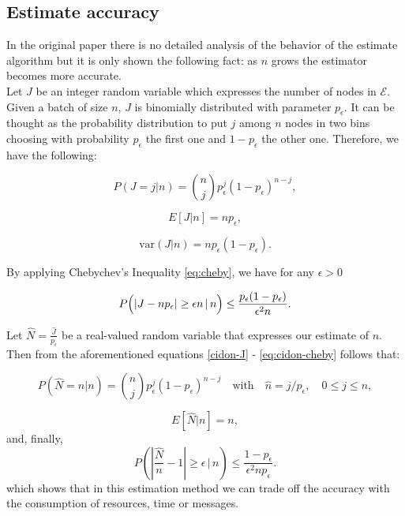 \documentclass[12pt,a4paper]{report}
\newcommand{\pc}{p_{\epsilon}}
\begin{document}
\subsection{Estimate accuracy}
\label{cidon-estimate-accuracy}

In the original paper \cite{cidon} there is no detailed analysis of the behavior of the estimate algorithm but it is only shown the following fact: as $n$ grows the estimator becomes more accurate.\\
    
Let $J$ be an integer random variable which expresses the number of nodes in $\mathcal{E}$. Given a batch of size $n$, $J$ is binomially distributed with parameter $\pc$. It can be thought as the probability distribution to put $j$ among  $n$ nodes in two bins choosing with probability $\pc$ the first one and $1-\pc$ the other one.  Therefore, we have the following:

\begin{equation}
	P(J=j|n)={n \choose j}\pc^{j}(1-\pc)^{n-j},
           \label{cidon-J}
\end{equation}

\begin{equation}
E[J|n]=n\pc ,
\label{cidon-e-estimate}
\end{equation}

\begin{equation}
\textrm{var}(J|n)=n\pc(1-\pc).
\end{equation}


By applying Chebychev's Inequality \eqref{eq:cheby},  we have for any $\epsilon>0$
 
 \begin{equation}
P\Bigl( \left| J-n\pc\right| \geq \epsilon n \,|\, n \Bigr) \leq \frac{\pc(1-\pc)}{\epsilon^{2}n}.
\label{eq:cidon-cheby}
 \end{equation}
 
 Let $\hat{N}={\displaystyle \frac{\hat{J}}{\pc}}$ be a real-valued random variable that expresses our estimate of $n$. Then from the aforementioned equations \eqref{cidon-J} - \eqref{eq:cidon-cheby} follows that:

\begin{equation}
P\left(\hat{N}=n|n\right)={n \choose j}\pc^{j}(1-\pc)^{n-j} \quad \textrm{with} \quad \hat{n}=j/\pc, \quad 0\leq j\leq n,
\end{equation}

\begin{equation}
E[\hat{N}|n]=n,
\end{equation}
and, finally,
 \begin{equation}
P\left( \left| \frac{\hat{N}}{n}-1\right| \geq \epsilon  \,\big|\, n \right) \leq \frac{1-\pc}{\epsilon^{2}n\pc}.
 \end{equation}
which shows that in this estimation method we can trade off the accuracy with the consumption of resources, time or messages.
\end{document}
